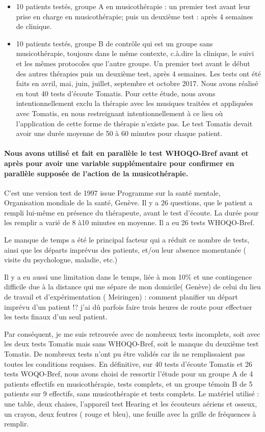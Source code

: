 \begin{itemize}
	\item 10 patients testés, groupe A en musicothérapie :  un premier test avant leur prise en
	charge en musicothérapie; puis un deuxième test \textdegree{}  : après 4 semaines de
	clinique. 
	\item 10 patients testés, groupe B de contrôle qui est un groupe sans musicothérapie,
	toujours dans le même contexte, c.à.dire la clinique, le suivi et les mêmes protocoles que l'autre groupe. Un premier test avant
	le début des autres thérapies puis un deuxième test, après 4 semaines. 
	Les tests ont été faits en avril, mai, juin, juillet, septembre et octobre 2017.
	Nous avons réalisé en tout 40 tests d'écoute Tomatis. Pour cette étude, nous avons intentionnellement exclu la thérapie avec les musiques traitées et appliquées avec Tomatis, en nous restreignant  intentionnellement à ce lieu où l'application de cette forme de thérapie n'existe pas.
	Le test Tomatis devait avoir une durée  moyenne de 50 à 60  minutes pour chaque patient.
\end{itemize}
 \paragraph{Nous avons utilisé et fait en parallèle le test WHOQO-Bref avant  
	et après pour avoir une variable supplémentaire pour confirmer en
	parallèle supposée de l'action de la musicothérapie.}
C'est une version test de 1997 issue Programme sur la santé mentale,
Organisation mondiale de la santé, Genève. Il y a 26 questions, que
le patient a rempli lui-même en présence du thérapeute, avant le test d'écoute. La durée pour les remplir a varié de 8 à10 minutes en moyenne.
Il a eu 26 tests WHOQO-Bref.

Le manque de temps a été le principal facteur qui a réduit ce nombre de tests, ainsi que les départs imprévus des patients, et/ou leur absence momentanée ( visite du psychologue, maladie, etc.)


 
  Il y a eu aussi une limitation dans le temps, liée à mon 10\% et  une contingence difficile due à la distance qui me sépare de mon domicile( Genève) de celui  du lieu de travail et d'expérimentation ( Meiringen) : comment planifier un départ imprévu d'un patient !? j'ai dû parfois faire  trois heures de route pour effectuer  les tests finaux d'un seul patient. 
  
   Par conséquent,  je me suis retrouvée avec de nombreux tests incomplets, soit avec les deux tests Tomatis mais sans WHOQO-Bref, soit le manque du deuxième test Tomatis. De nombreux tests n'ont pu être validés car ils ne remplissaient pas toutes les conditions requises.
    En définitive, sur 40 tests d'écoute Tomatis et 26 tests WOQO-Bref, nous avons choisi de ressortir  l'étude  pour  un groupe A de 4 patients effectifs en musicothérapie, tests complets, et un groupe témoin B de 5 patients sur 9 effectifs, sans musicothérapie et tests complets.  
   Le matériel utilisé : une table, deux chaises, l'appareil test Hearing et les écouteurs aériens et osseux, un crayon, deux feutres ( rouge et bleu), une feuille avec la grille de fréquences à remplir. 
 
